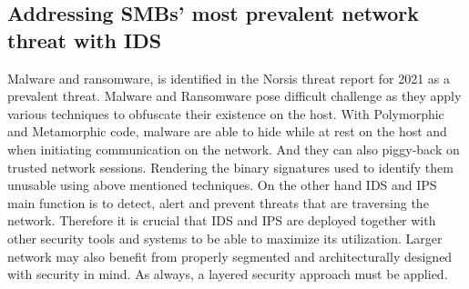 \subsection{Addressing SMBs' most prevalent network threat with IDS}

Malware and ransomware, is identified in the Norsis \cite{Norsis2021} threat report for 2021 as a prevalent threat. Malware and Ransomware pose difficult challenge as they apply various techniques to obfuscate their existence on the host. With Polymorphic and Metamorphic code, malware are able to hide while at rest on the host and when initiating communication on the network. And they can also piggy-back on trusted network sessions. Rendering the binary signatures used to identify them unusable using above mentioned techniques. On the other hand IDS and IPS main function is to detect, alert and prevent threats that are traversing the network. Therefore it is crucial that IDS and IPS are deployed together with other security tools and systems to be able to maximize its utilization. Larger network may also benefit from properly segmented and architecturally designed with security in mind. As always, a layered security approach must be applied.\\

\newpage